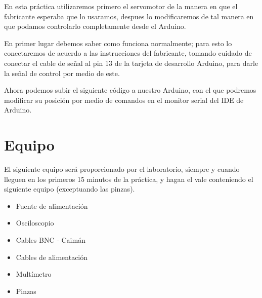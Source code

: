 

		En esta práctica utilizaremos primero el servomotor de la manera en que el fabricante esperaba que lo usaramos, despues lo modificaremos de tal manera en que podamos controlarlo completamente desde el Arduino.

		En primer lugar debemos saber como funciona normalmente; para esto lo conectaremos de acuerdo a las instrucciones del fabricante, tomando cuidado de conectar el cable de señal al pin 13 de la tarjeta de desarrollo Arduino, para darle la señal de control por medio de este.

		Ahora podemos subir el siguiente código a nuestro Arduino, con el que podremos modificar su posición por medio de comandos en el monitor serial del IDE de Arduino.

		



\section{Equipo}

	El siguiente equipo será proporcionado por el laboratorio, siempre y cuando lleguen en los primeros 15 minutos de la práctica, y hagan el vale conteniendo el siguiente equipo (exceptuando las pinzas).

	\begin{itemize}
		\item Fuente de alimentación
		\item Osciloscopio
		\item Cables BNC - Caimán
		\item Cables de alimentación
		\item Multímetro
		\item Pinzas
	\end{itemize}

